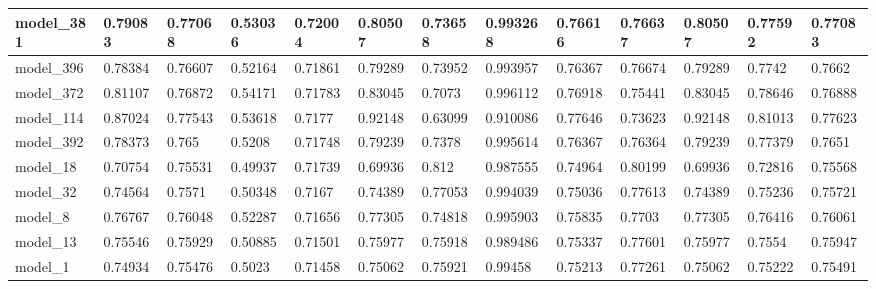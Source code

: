 \begin{tabular}{|l|l|l|l|l|l|l|l|l|l|l|l|l|}
model\_381     & 0.79083     & 0.77068        & 0.53036      & 0.72004          & 0.80507              & 0.73658              & 0.993268     & 0.76616           & 0.76637            & 0.80507         & 0.77592     & 0.77083      \\ \hline
model\_396     & 0.78384     & 0.76607        & 0.52164      & 0.71861          & 0.79289              & 0.73952              & 0.993957     & 0.76367           & 0.76674            & 0.79289         & 0.7742      & 0.7662       \\ \hline
model\_372     & 0.81107     & 0.76872        & 0.54171      & 0.71783          & 0.83045              & 0.7073               & 0.996112     & 0.76918           & 0.75441            & 0.83045         & 0.78646     & 0.76888      \\ \hline
model\_114     & 0.87024     & 0.77543        & 0.53618      & 0.7177           & 0.92148              & 0.63099              & 0.910086     & 0.77646           & 0.73623            & 0.92148         & 0.81013     & 0.77623      \\ \hline
model\_392     & 0.78373     & 0.765          & 0.5208       & 0.71748          & 0.79239              & 0.7378               & 0.995614     & 0.76367           & 0.76364            & 0.79239         & 0.77379     & 0.7651       \\ \hline
model\_18      & 0.70754     & 0.75531        & 0.49937      & 0.71739          & 0.69936              & 0.812                & 0.987555     & 0.74964           & 0.80199            & 0.69936         & 0.72816     & 0.75568      \\ \hline
model\_32      & 0.74564     & 0.7571         & 0.50348      & 0.7167           & 0.74389              & 0.77053              & 0.994039     & 0.75036           & 0.77613            & 0.74389         & 0.75236     & 0.75721      \\ \hline
model\_8       & 0.76767     & 0.76048        & 0.52287      & 0.71656          & 0.77305              & 0.74818              & 0.995903     & 0.75835           & 0.7703             & 0.77305         & 0.76416     & 0.76061      \\ \hline
model\_13      & 0.75546     & 0.75929        & 0.50885      & 0.71501          & 0.75977              & 0.75918              & 0.989486     & 0.75337           & 0.77601            & 0.75977         & 0.7554      & 0.75947      \\ \hline
model\_1       & 0.74934     & 0.75476        & 0.5023       & 0.71458          & 0.75062              & 0.75921              & 0.99458      & 0.75213           & 0.77261            & 0.75062         & 0.75222     & 0.75491      \\ \hline

\end{tabular}
